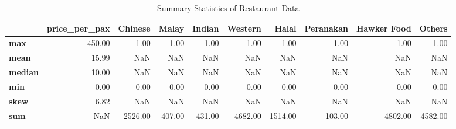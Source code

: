 \begin{table}
\centering
\caption{Summary Statistics of Restaurant Data}
\begin{tabular}{lrrrrrrrrr}
\toprule
{} &  price\_per\_pax &  Chinese &  Malay &  Indian &  Western &   Halal &  Peranakan &  Hawker Food &  Others \\
\midrule
\textbf{max   } &         450.00 &     1.00 &   1.00 &    1.00 &     1.00 &    1.00 &       1.00 &         1.00 &    1.00 \\
\textbf{mean  } &          15.99 &      NaN &    NaN &     NaN &      NaN &     NaN &        NaN &          NaN &     NaN \\
\textbf{median} &          10.00 &      NaN &    NaN &     NaN &      NaN &     NaN &        NaN &          NaN &     NaN \\
\textbf{min   } &           0.00 &     0.00 &   0.00 &    0.00 &     0.00 &    0.00 &       0.00 &         0.00 &    0.00 \\
\textbf{skew  } &           6.82 &      NaN &    NaN &     NaN &      NaN &     NaN &        NaN &          NaN &     NaN \\
\textbf{sum   } &            NaN &  2526.00 & 407.00 &  431.00 &  4682.00 & 1514.00 &     103.00 &      4802.00 & 4582.00 \\
\bottomrule
\end{tabular}
\end{table}

